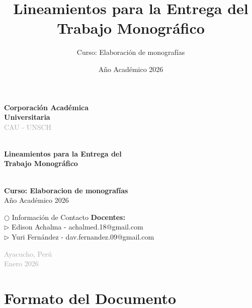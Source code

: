 \documentclass[12pt,a4paper]{article}
\title{\textbf{Lineamientos para la Entrega del\\Trabajo Monográfico}}
\author{Curso: Elaboración de monografías}
\date{Año Académico 2026}
\begin{document}
\begin{titlepage}
  \centering
  \vspace*{1cm}
  
  
  {\Huge\bfseries\textcolor{primaryblue}{Corporación Académica\\ Universitaria}}\\[0.5cm]
  \textcolor{darkgray}{\large CAU - UNSCH}\\[2cm]
  
  \\[0.5cm]
  
  {\Huge\bfseries\textcolor{secondaryblue}{Lineamientos para la Entrega del\\Trabajo Monográfico}}\\[0.5cm]
  
  \\[1.5cm]
  
  {\Large\textbf{Curso: Elaboracion de monografías}}\\[0.3cm]
  {\large Año Académico 2026}\\[3cm]
  
  \begin{infobox}{$\bigcirc$ Información de Contacto}
    \textbf{Docentes:}\\
    $\triangleright$ Edison Achalma - achalmed.18@gmail.com\\
    $\triangleright$ Yuri Fernández - dav.fernandez.09@gmail.com
  \end{infobox}
  
  \vfill
  {\large\textcolor{darkgray}{Ayacucho, Perú\\Enero 2026}}
\end{titlepage}

\tableofcontents
\newpage


\section{Formato del Documento}
\end{document}
